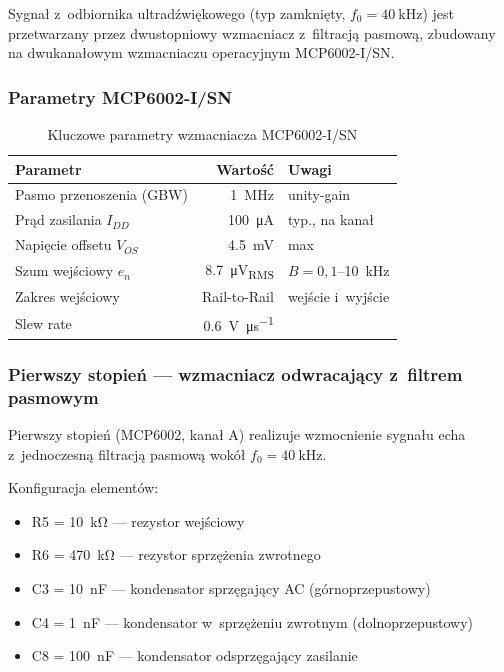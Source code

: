 \documentclass[a4paper,11pt]{article}
\begin{document}
Sygnał z~odbiornika ultradźwiękowego (typ zamknięty, $f_0 = \SI{40}{\kilo\hertz}$)
jest przetwarzany przez dwustopniowy wzmacniacz z~filtracją pasmową, zbudowany
na dwukanałowym wzmacniaczu operacyjnym MCP6002-I/SN.

\subsubsection{Parametry MCP6002-I/SN}

\begin{table}[H]
    \centering
    \caption{Kluczowe parametry wzmacniacza MCP6002-I/SN}
    \label{tab:mcp6002}
    \begin{tabular}{lrl}
        \toprule
        \textbf{Parametr} & \textbf{Wartość} & \textbf{Uwagi} \\
        \midrule
        Pasmo przenoszenia (GBW) & \SI{1}{\mega\hertz} & unity-gain \\
        Prąd zasilania $I_{DD}$ & \SI{100}{\micro\ampere} & typ., na kanał \\
        Napięcie offsetu $V_{OS}$ & \SI{4,5}{\milli\volt} & max \\
        Szum wejściowy $e_n$ & \SI{8,7}{\micro\volt_{RMS}} & $B = 0{,}1$--\SI{10}{\kilo\hertz} \\
        Zakres wejściowy & Rail-to-Rail & wejście i~wyjście \\
        Slew rate & \SI{0,6}{\volt\per\micro\second} & \\
        \bottomrule
    \end{tabular}
\end{table}

\subsubsection{Pierwszy stopień --- wzmacniacz odwracający z~filtrem pasmowym}

Pierwszy stopień (MCP6002, kanał A) realizuje wzmocnienie sygnału echa
z~jednoczesną filtracją pasmową wokół $f_0 = \SI{40}{\kilo\hertz}$.

Konfiguracja elementów:
\begin{itemize}[nosep]
    \item R5 = \SI{10}{\kilo\ohm} --- rezystor wejściowy
    \item R6 = \SI{470}{\kilo\ohm} --- rezystor sprzężenia zwrotnego
    \item C3 = \SI{10}{\nano\farad} --- kondensator sprzęgający AC (górnoprzepustowy)
    \item C4 = \SI{1}{\nano\farad} --- kondensator w~sprzężeniu zwrotnym (dolnoprzepustowy)
    \item C8 = \SI{100}{\nano\farad} --- kondensator odsprzęgający zasilanie
\end{itemize}
\end{document}
